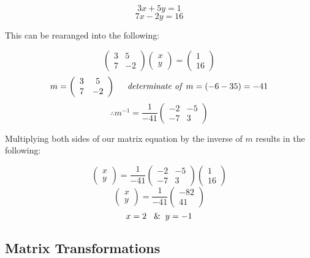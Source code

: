 \documentclass{article}
\begin{document}
\[3x+5y=1\]
\[7x-2y=16\]

This can be rearanged into the following:

\[\left(\begin{array}{cc} 3 & 5 \\ 7 & -2 \end{array}\right)\left(\begin{array}{c} x \\ y \end{array}\right)=\left(\begin{array}{c} 1 \\ 16 \end{array}\right)\]
\[m=\left(\begin{array}{cc} 3 & 5 \\ 7 & -2 \end{array}\right) \hspace{0.5cm} \text{\textit{determinate of} } m=\left(-6-35\right)=-41\]
\[ \therefore m^{-1} = \frac{1}{-41} \left(\begin{array}{cc} -2 & -5 \\ -7 & 3 \end{array}\right)\]

Multiplying both sides of our matrix equation by the inverse of \(m\) results in the following:

\[\left(\begin{array}{c} x \\ y \end{array}\right) = \frac{1}{-41} \left(\begin{array}{cc} -2 & -5 \\ -7 & 3 \end{array}\right) \left(\begin{array}{c} 1 \\ 16 \end{array}\right)\]
\[\left(\begin{array}{c} x \\ y \end{array}\right) = \frac{1}{-41} \left(\begin{array}{c} -82 \\ 41 \end{array}\right)\]
\[x=2 \hspace{0.3cm} \& \hspace{0.2cm} y=-1\]

\subsection{Matrix Transformations}
\end{document}
